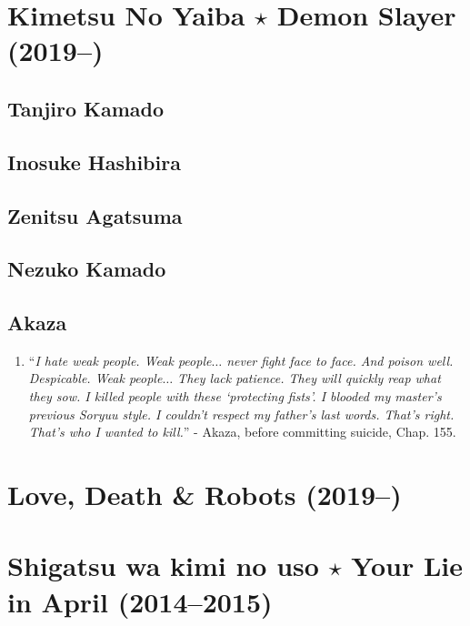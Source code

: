 \documentclass{book}
\numberwithin{equation}{section}
\begin{document}
\chapter{Kimetsu No Yaiba $\star$ Demon Slayer (2019--)}

\section{Tanjiro Kamado}

\section{Inosuke Hashibira}

\section{Zenitsu Agatsuma}

\section{Nezuko Kamado}

\section{Akaza}
\begin{enumerate}
    \item ``\textit{I hate weak people. Weak people$\ldots$ never fight face to face. And poison well. Despicable. Weak people$\ldots$ They lack patience. They will quickly reap what they sow. I killed people with these `protecting fists'. I blooded my master's previous Soryuu style. I couldn't respect my father's last words. That's right. That's who I wanted to kill.}'' - Akaza, before committing suicide, Chap. 155.
\end{enumerate}


\chapter{Love, Death \& Robots (2019--)}


\chapter{Shigatsu wa kimi no uso $\star$ Your Lie in April (2014--2015)}
\end{document}
